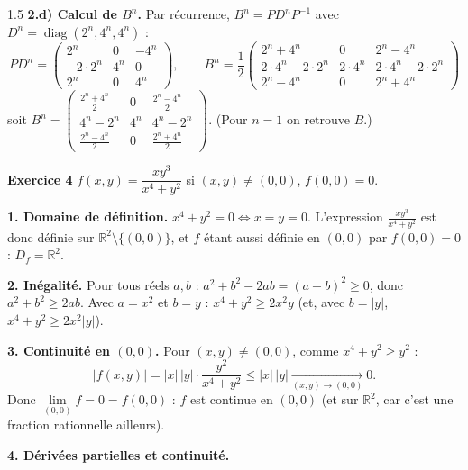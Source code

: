 \documentclass[12pt]{article}
\begin{document}
\begin{spacing}{1.5}
\textbf{2.d) Calcul de $B^n$.} Par récurrence, $B^n=PD^nP^{-1}$ avec $D^n=\operatorname{diag}(2^n,4^n,4^n)$ :
\[
PD^n=\begin{pmatrix}2^n&0&-4^n\\-2\cdot2^n&4^n&0\\2^n&0&4^n\end{pmatrix},\qquad
\boxed{B^n=\frac12\begin{pmatrix}2^n+4^n&0&2^n-4^n\\2\cdot4^n-2\cdot2^n&2\cdot4^n&2\cdot4^n-2\cdot2^n\\2^n-4^n&0&2^n+4^n\end{pmatrix}}
\]
soit $B^n=\begin{pmatrix}\frac{2^n+4^n}{2}&0&\frac{2^n-4^n}{2}\\4^n-2^n&4^n&4^n-2^n\\\frac{2^n-4^n}{2}&0&\frac{2^n+4^n}{2}\end{pmatrix}$. (Pour $n=1$ on retrouve $B$.)

\medskip\textbf{Exercice 4} \quad $f(x,y)=\dfrac{xy^3}{x^4+y^2}$ si $(x,y)\neq(0,0)$, $f(0,0)=0$.

\textbf{1. Domaine de définition.} $x^4+y^2=0\iff x=y=0$. L'expression $\frac{xy^3}{x^4+y^2}$ est donc définie sur $\mathbb{R}^2\setminus\{(0,0)\}$, et $f$ étant aussi définie en $(0,0)$ par $f(0,0)=0$ : $\boxed{D_f=\mathbb{R}^2}$.

\textbf{2. Inégalité.} Pour tous réels $a,b$ : $a^2+b^2-2ab=(a-b)^2\ge0$, donc $a^2+b^2\ge2ab$. Avec $a=x^2$ et $b=y$ : $x^4+y^2\ge2x^2y$ (et, avec $b=|y|$, $x^4+y^2\ge2x^2|y|$).

\textbf{3. Continuité en $(0,0)$.} Pour $(x,y)\neq(0,0)$, comme $x^4+y^2\ge y^2$ :
\[
|f(x,y)|=|x|\,|y|\cdot\frac{y^2}{x^4+y^2}\le|x|\,|y|\xrightarrow[(x,y)\to(0,0)]{}0 .
\]
Donc $\lim\limits_{(0,0)}f=0=f(0,0)$ : $f$ est continue en $(0,0)$ (et sur $\mathbb{R}^2$, car c'est une fraction rationnelle ailleurs).


\textbf{4. Dérivées partielles et continuité.}


\end{spacing}
\end{document}
